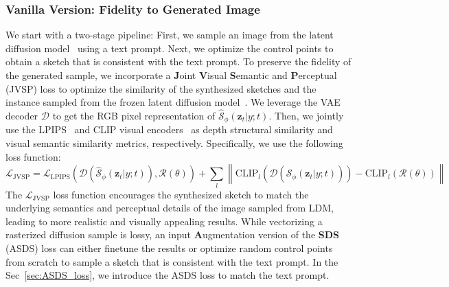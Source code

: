 \documentclass{article}
\begin{document}
\subsubsection{Vanilla Version: Fidelity to Generated Image}
\label{sec:vanilla_version}
We start with a two-stage pipeline: First, we sample an image from the latent diffusion model~\cite{ldm_2022_Rombach} using a text prompt. Next, we optimize the control points to obtain a sketch that is consistent with the text prompt. 
To preserve the fidelity of the generated sample, we incorporate a \textbf{J}oint \textbf{V}isual \textbf{S}emantic and \textbf{P}erceptual (JVSP) loss to optimize the similarity of the synthesized sketches and the instance sampled from the frozen latent diffusion model~\cite{ldm_2022_Rombach}.
We leverage the VAE~\cite{taming_2021_esser} decoder $\mathcal{D}$ to get the RGB pixel representation of $\hat{\mathcal{S}}_{\phi}(\mathbf{z}_t|y;t)$.
Then, we jointly use the LPIPS~\cite{lpips_zhang_2018} and CLIP visual encoders~\cite{clip_radford_2021,vinker_2022_clipasso} as depth structural similarity and visual semantic similarity metrics, respectively.
Specifically, we use the following loss function:
\begin{equation}
\mathcal{L}_{\mathrm{JVSP}} = 
\mathcal{L}_{\mathrm{LPIPS}}(\mathcal{D}(\hat{\mathcal{S}}_{\phi}(\mathbf{z}_t|y;t)), \mathcal{R}(\theta)) + 
\sum_l \left\| \mathrm{CLIP}_l (\mathcal{D}(\hat{\mathcal{S}}_{\phi}(\mathbf{z}_t|y;t))) - \mathrm{CLIP}_l (\mathcal{R}(\theta)) \right\|
\end{equation}
The $\mathcal{L}_{\mathrm{JVSP}}$ loss function encourages the synthesized sketch to match the underlying semantics and perceptual details of the image sampled from LDM, leading to more realistic and visually appealing results.
While vectorizing a rasterized diffusion sample is lossy, an input \textbf{A}ugmentation version of the \textbf{SDS} (ASDS) loss can either finetune the results or optimize random control points from scratch to sample a sketch that is consistent with the text prompt.
In the Sec~\ref{sec:ASDS_loss}, we introduce the ASDS loss to match the text prompt.
\end{document}
